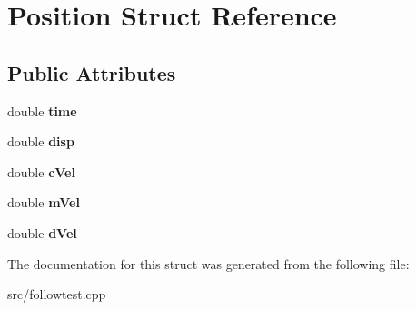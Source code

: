 \hypertarget{structPosition}{}\section{Position Struct Reference}
\label{structPosition}
\subsection*{Public Attributes}
\begin{DoxyCompactItemize}
\item 
\mbox{\label{structPosition_aca65d81e8c3f50786365ac22c4e077bd}} 
double {\bfseries time}
\item 
\mbox{\label{structPosition_a06b75a533b23e3814633aeea8858e71f}} 
double {\bfseries disp}
\item 
\mbox{\label{structPosition_a5ec27ede6fe004c00c2a78732cd7d658}} 
double {\bfseries c\+Vel}
\item 
\mbox{\label{structPosition_ab257e5d4c700b3fcb782d84b67b11a07}} 
double {\bfseries m\+Vel}
\item 
\mbox{\label{structPosition_a3c67162c41350e3efac3f062dfa5da92}} 
double {\bfseries d\+Vel}
\end{DoxyCompactItemize}


The documentation for this struct was generated from the following file\+:\begin{DoxyCompactItemize}
\item 
src/followtest.\+cpp\end{DoxyCompactItemize}
